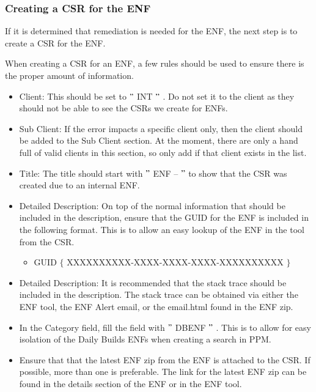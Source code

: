 \documentclass[a4paper,12pt]{report}
\begin{document}
\subsubsection*{Creating a CSR for the ENF}
 \par
If it is determined that remediation is needed for the ENF, the next step is to create a CSR for the ENF. \par
When creating a CSR for an ENF, a few rules should be used to ensure there is the proper amount of information. \par
\begin{itemize}
\item Client: This should be set to  $ " $ INT $ " $ . Do not set it to the client as they should not be able to see the CSRs we create for ENFs. \par
\item Sub Client: If the error impacts a specific client only, then the client should be added to the Sub Client section. At the moment, there are only a hand full of valid clients in this section, so only add if that client exists in the list. \par
\item Title: The title should start with  $ " $ ENF –  $ " $  to show that the CSR was created due to an internal ENF. \par
\item Detailed Description: On top of the normal information that should be included in the description, ensure that the GUID for the ENF is included in the following format. This is to allow an easy lookup of the ENF in the tool from the CSR. \par
\begin{itemize}
\item GUID  $  \{  $ XXXXXXXXXX-XXXX-XXXX-XXXX-XXXXXXXXXX  $  \}  $  \par
\end{itemize}
\item Detailed Description: It is recommended that the stack trace should be included in the description. The stack trace can be obtained via either the ENF tool, the ENF Alert email, or the email.html found in the ENF zip. \par
\item In the Category field, fill the field with  $ " $ DBENF $ " $ . This is to allow for easy isolation of the Daily Builds ENFs when creating a search in PPM. \par
\item Ensure that that the latest ENF zip from the ENF is attached to the CSR. If possible, more than one is preferable. The link for the latest ENF zip can be found in the details section of the ENF or in the ENF tool. \par

\end{itemize}
\end{document}
